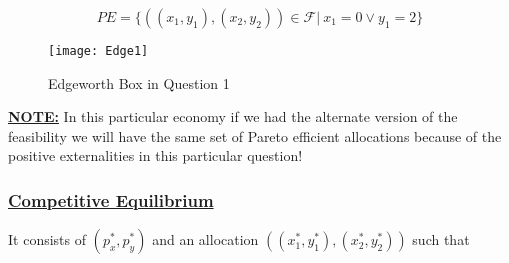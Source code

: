 \documentclass[12pt,a4paper]{article}
\begin{document}
  \begin{equation*}
      PE= \{\left( (x_{1},y_{1}),(x_{2},y_{2}) \right) \in \mathcal{F} | \ x_{1}=0 \vee y_{1}=2\} 
  \end{equation*}    
  
  \begin{center}
    \begin{figure}[ht!]
        \centering
        \texttt{[image: Edge1]}
        \caption{Edgeworth Box in Question 1}
        \label{Label}
    \end{figure}
  \end{center}

  \textbf{\underline{NOTE:}}
  In this particular economy if we had the alternate version of the feasibility we will have the same set of Pareto efficient allocations because of the positive externalities in this particular question!

  \subsubsection*{\underline{Competitive Equilibrium}}
  It consists of \(\left( p_{x}^*, p_{y}^* \right) \)   and an allocation \(\left( (x_{1}^*,y_{1}^*),(x_{2}^*,y_{2}^*) \right) \)  such that
    
\end{document}
